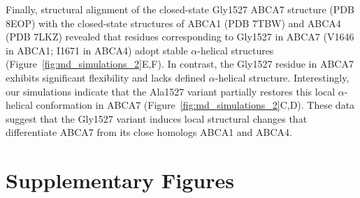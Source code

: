 \documentclass[12pt]{article}
\begin{document}
\quoteO

Finally, structural alignment of the closed-state Gly1527 ABCA7 structure (PDB 8EOP) with the closed-state structures of ABCA1 (PDB 7TBW) and ABCA4 (PDB 7LKZ) revealed that residues corresponding to Gly1527 in ABCA7 (V1646 in ABCA1; I1671 in ABCA4) adopt stable $\alpha$-helical structures (Figure~\ref{fig:md_simulations_2}E,F). In contrast, the Gly1527 residue in ABCA7 exhibits significant flexibility and lacks defined $\alpha$-helical structure. Interestingly, our simulations indicate that the Ala1527 variant partially restores this local $\alpha$-helical conformation in ABCA7 (Figure~\ref{fig:md_simulations_2}C,D). These data suggest that the Gly1527 variant induces local structural changes that differentiate ABCA7 from its close homologs ABCA1 and ABCA4.
 \clearpage
{} 

\nolinenumbers

\section{Supplementary Figures}
\label{sec:supplementary_figures}


\newif\ifdocx


\ifdocx
\else
\renewcommand{\thefigure}{S\arabic{figure}}
  \setcounter{figure}{0}
\fi

\clearpage
\end{document}
